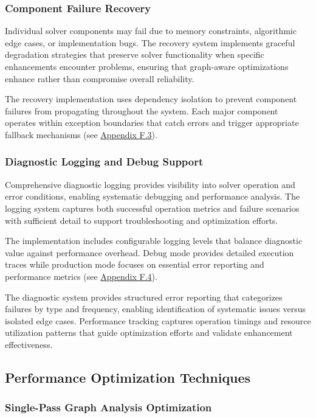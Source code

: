 \subsubsection{Component Failure Recovery}

Individual solver components may fail due to memory constraints, algorithmic edge cases, or implementation bugs. The recovery system implements graceful degradation strategies that preserve solver functionality when specific enhancements encounter problems, ensuring that graph-aware optimizations enhance rather than compromise overall reliability.

The recovery implementation uses dependency isolation to prevent component failures from propagating throughout the system. Each major component operates within exception boundaries that catch errors and trigger appropriate fallback mechanisms (see \hyperref[appendix:component-recovery]{Appendix F.3}).

\subsubsection{Diagnostic Logging and Debug Support}

Comprehensive diagnostic logging provides visibility into solver operation and error conditions, enabling systematic debugging and performance analysis. The logging system captures both successful operation metrics and failure scenarios with sufficient detail to support troubleshooting and optimization efforts.

The implementation includes configurable logging levels that balance diagnostic value against performance overhead. Debug mode provides detailed execution traces while production mode focuses on essential error reporting and performance metrics (see \hyperref[appendix:diagnostic-logging]{Appendix F.4}).

The diagnostic system provides structured error reporting that categorizes failures by type and frequency, enabling identification of systematic issues versus isolated edge cases. Performance tracking captures operation timings and resource utilization patterns that guide optimization efforts and validate enhancement effectiveness.

\subsection{Performance Optimization Techniques}

\subsubsection{Single-Pass Graph Analysis Optimization}

